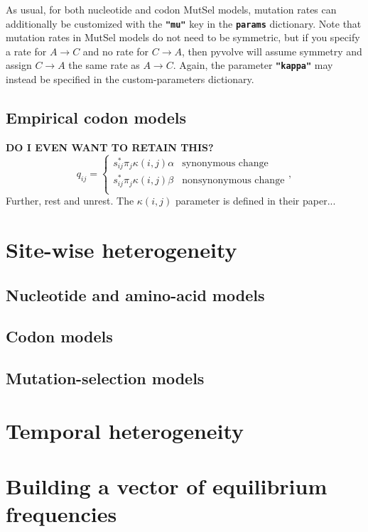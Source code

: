 \documentclass{article}
\newcommand{\code}[1]{\textbf{\texttt{\small{#1}}}}
\begin{document}
As usual, for both nucleotide and codon MutSel models, mutation rates can additionally be customized with the \code{"mu"} key in the \code{params} dictionary. Note that mutation rates in MutSel models do not need to be symmetric, but if you specify a rate for $A \rightarrow C$ and no rate for $C \rightarrow A$, then pyvolve will assume symmetry and assign $C \rightarrow A$ the same rate as $A \rightarrow C$. Again, the parameter \code{"kappa"} may instead be specified in the custom-parameters dictionary.


\subsection{Empirical codon models}\label{sec:ecm_basic}
\textbf{DO I EVEN WANT TO RETAIN THIS?}
\begin{equation}\label{eq:ecmrest}
q_{ij} = \left\{ 
\begin{array}{rl}
s^\ast_{ij} \pi_j \kappa(i,j) \alpha      &\text{synonymous change} \\
s^\ast_{ij} \pi_j \kappa(i,j) \beta       &\text{nonsynonymous change} \\
\end{array} \right.,
\end{equation}
Further, rest and unrest. The $\kappa(i,j)$ parameter is defined in their paper...



\section{Site-wise heterogeneity}
\subsection{Nucleotide and amino-acid models}
\subsection{Codon models}
\subsection{Mutation-selection models}
\section{Temporal heterogeneity}\label{sec:temphet}
\section{Building a vector of equilibrium frequencies}\label{sec:freqs}
\end{document}
